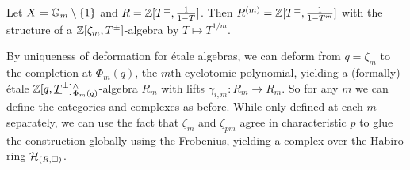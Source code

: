 \begin{example}
    Let $X=\mathbb{G}_{m}\setminus\{1\}$ and $R=\mathbb{Z}[T^{\pm},\frac{1}{1-T}]$. Then $R^{(m)}=\mathbb{Z}[T^{\pm},\frac{1}{1-T^{m}}]$ with the structure of a $\mathbb{Z}[\zeta_{m},T^{\pm}]$-algebra by $T\mapsto T^{1/m}$.
\end{example}
By uniqueness of deformation for \'{e}tale algebras, we can deform from $q=\zeta_{m}$ to the completion at $\Phi_{m}(q)$, the $m$th cyclotomic polynomial, yielding a (formally) \'{e}tale $\mathbb{Z}[q,\underline{T}^{\pm}]^{\wedge}_{\Phi_{m}(q)}$-algebra $R_{m}$ with lifts $\gamma_{i,m}:R_{m}\to R_{m}$. So for any $m$ we can define the categories and complexes as before. While only defined at each $m$ separately, we can use the fact that $\zeta_{m}$ and $\zeta_{pm}$ agree in characteristic $p$ to glue the construction globally using the Frobenius, yielding a complex over the Habiro ring $\mathcal{H}_{(R,\square)}$. 